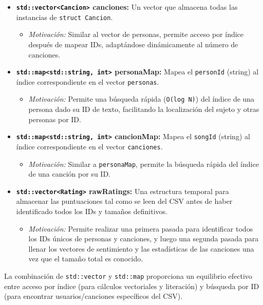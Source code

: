 \documentclass{article}
\begin{document}
\begin{itemize}[label=\textbullet]
\begin{itemize}[label=\textendash]
    \end{itemize}
    \item \textbf{\texttt{std::vector<Cancion>} canciones:} Un vector que almacena todas las instancias de \texttt{struct Cancion}.
    \begin{itemize}[label=\textendash]
        \item \textit{Motivación:} Similar al vector de personas, permite acceso por índice después de mapear IDs, adaptándose dinámicamente al número de canciones.
    \end{itemize}
    \item \textbf{\texttt{std::map<std::string, int>} personaMap:} Mapea el \texttt{personId} (string) al índice correspondiente en el vector \texttt{personas}.
    \begin{itemize}[label=\textendash]
        \item \textit{Motivación:} Permite una búsqueda rápida (\texttt{O(log N)}) del índice de una persona dado su ID de texto, facilitando la localización del sujeto y otras personas por ID.
    \end{itemize}
    \item \textbf{\texttt{std::map<std::string, int>} cancionMap:} Mapea el \texttt{songId} (string) al índice correspondiente en el vector \texttt{canciones}.
    \begin{itemize}[label=\textendash]
        \item \textit{Motivación:} Similar a \texttt{personaMap}, permite la búsqueda rápida del índice de una canción por su ID.
    \end{itemize}
    \item \textbf{\texttt{std::vector<Rating>} rawRatings:} Una estructura temporal para almacenar las puntuaciones tal como se leen del CSV antes de haber identificado todos los IDs y tamaños definitivos.
     \begin{itemize}[label=\textendash]
        \item \textit{Motivación:} Permite realizar una primera pasada para identificar todos los IDs únicos de personas y canciones, y luego una segunda pasada para llenar los vectores de sentimiento y las estadísticas de las canciones una vez que el tamaño total es conocido.
    \end{itemize}
\end{itemize}

La combinación de \texttt{std::vector} y \texttt{std::map} proporciona un equilibrio efectivo entre acceso por índice (para cálculos vectoriales y literación) y búsqueda por ID (para encontrar usuarios/canciones específicos del CSV).
\end{document}
